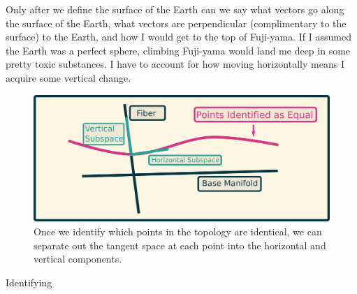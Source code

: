   Only after we define the surface of the Earth can we say what vectors go along the surface of the Earth, what vectors are perpendicular (complimentary to the surface) to the Earth, and how I would get to the top of Fuji-yama.  If I assumed the Earth was a perfect sphere, climbing Fuji-yama would land me deep in some pretty toxic substances.  I have to account for how moving horizontally means I acquire some vertical change.

\begin{figure}
  \includegraphics[width=\textwidth]{pics/bundle_tangent.png}
  \caption{Once we identify which points in the topology are identical, we can separate out the tangent space at each point into the horizontal and vertical components.}
  \label{fig:bundle_tangent}
\end{figure}

Identifying 
